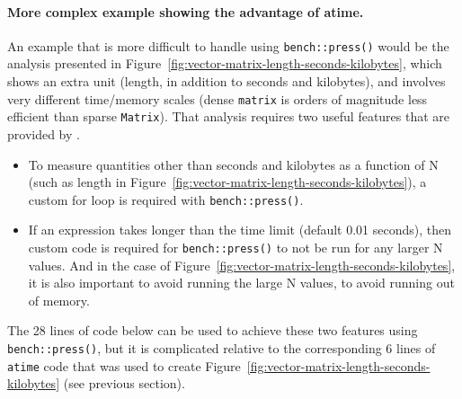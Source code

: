 \paragraph{More complex example showing the advantage of atime.}
An example that is more difficult to handle using \verb|bench::press()| would be the analysis presented in Figure~\ref{fig:vector-matrix-length-seconds-kilobytes}, which shows an extra unit (length, in addition to seconds and kilobytes), and involves very different time/memory scales (dense \texttt{matrix} is orders of magnitude less efficient than sparse \texttt{Matrix}).
That analysis requires two useful features that are provided by . 
\begin{itemize}
\item To measure quantities other than seconds and kilobytes as a function of N (such as length in Figure~\ref{fig:vector-matrix-length-seconds-kilobytes}), a custom for loop is required with \verb|bench::press()|.
\item If an expression takes longer than the time limit (default 0.01 seconds), then custom code is required for \verb|bench::press()| to not be run for any larger N values. 
And in the case of Figure~\ref{fig:vector-matrix-length-seconds-kilobytes}, it is also important to avoid running the large N values, to avoid running out of memory.
\end{itemize}
The 28 lines of code below can be used to achieve these two features using \verb|bench::press()|, but it is complicated relative to the corresponding 6 lines of \verb|atime| code that was used to create Figure~\ref{fig:vector-matrix-length-seconds-kilobytes} (see previous section).

